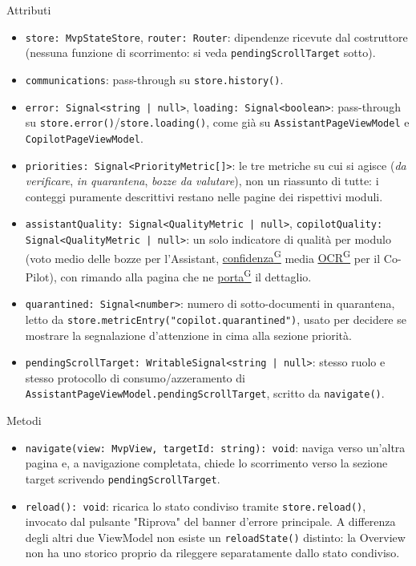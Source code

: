 \documentclass[a4paper,12pt]{article}
\providecommand{\glslink}[2]{\href{https://alittlebyte-19.github.io/Documentazione/glossario.html\#gls-#1}{\underline{#2}\textsuperscript{\scriptsize G}}}
\begin{document}
\begin{sloppypar}
Attributi
\begin{itemize}\raggedright
    \item \texttt{store: MvpStateStore}, \texttt{router: Router}: dipendenze ricevute dal costruttore (nessuna funzione di scorrimento: si veda \texttt{pendingScrollTarget} sotto).
    \item \texttt{communications}: pass-through su \texttt{store.history()}.
    \item \texttt{error: Signal<string | null>}, \texttt{loading: Signal<boolean>}: pass-through su \texttt{store.error()}/\texttt{store.loading()}, come già su \texttt{AssistantPageViewModel} e \texttt{CopilotPageViewModel}.
    \item \texttt{priorities: Signal<PriorityMetric[]>}: le tre metriche su cui si agisce (\textit{da verificare}, \textit{in quarantena}, \textit{bozze da valutare}), non un riassunto di tutte: i conteggi puramente descrittivi restano nelle pagine dei rispettivi moduli.
    \item \texttt{assistantQuality: Signal<QualityMetric | null>}, \texttt{copilotQuality: Signal<QualityMetric | null>}: un solo indicatore di qualità per modulo (voto medio delle bozze per l'Assistant, \glslink{confidenza-confidence-score}{confidenza} media \glslink{ocr-riconoscimento-ottico-dei-caratteri}{OCR} per il Co-Pilot), con rimando alla pagina che ne \glslink{porta}{porta} il dettaglio.
    \item \texttt{quarantined: Signal<number>}: numero di sotto-documenti in quarantena, letto da \texttt{store.metricEntry("copilot.quarantined")}, usato per decidere se mostrare la segnalazione d'attenzione in cima alla sezione priorità.
    \item \texttt{pendingScrollTarget: WritableSignal<string | null>}: stesso ruolo e stesso protocollo di consumo/azzeramento di \texttt{AssistantPageViewModel.pendingScrollTarget}, scritto da \texttt{navigate()}.
\end{itemize}

Metodi
\begin{itemize}\raggedright
    \item \texttt{navigate(view: MvpView, targetId: string): void}: naviga verso un'altra pagina e, a navigazione completata, chiede lo scorrimento verso la sezione target scrivendo \texttt{pendingScrollTarget}.
    \item \texttt{reload(): void}: ricarica lo stato condiviso tramite \texttt{store.reload()}, invocato dal pulsante "Riprova" del banner d'errore principale. A differenza degli altri due ViewModel non esiste un \texttt{reloadState()} distinto: la Overview non ha uno storico proprio da rileggere separatamente dallo stato condiviso.
\end{itemize}


\end{sloppypar}
\end{document}
